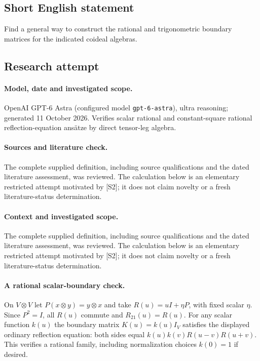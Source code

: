 \documentclass[11pt]{article}
\begin{document}
\subsection{Short English statement}
Find a general way to construct the rational and trigonometric boundary matrices for the indicated coideal algebras.
\subsection{Research attempt}
\paragraph{Model, date and investigated scope.}
OpenAI GPT-6 Astra (configured model \texttt{gpt-6-astra}), ultra reasoning; generated 11 October 2026. Verifies scalar rational and constant-square rational reflection-equation ansätze by direct tensor-leg algebra.

\paragraph{Sources and literature check.}
The complete supplied definition, including source qualifications and the dated literature assessment, was reviewed. The calculation below is an elementary restricted attempt motivated by [S2]; it does not claim novelty or a fresh literature-status determination.

\paragraph{Context and investigated scope.} The complete supplied definition, including source qualifications and the dated literature assessment, was reviewed. The calculation below is an elementary restricted attempt motivated by [S2]; it does not claim novelty or a fresh literature-status determination.

\paragraph{A rational scalar-boundary check.} On $V\otimes V$ let $P(x\otimes y)=y\otimes x$ and take $R(u)=uI+\eta P$, with fixed scalar $\eta$. Since $P^2=I$, all $R(u)$ commute and $R_{21}(u)=R(u)$. For any scalar function $k(u)$ the boundary matrix $K(u)=k(u)I_V$ satisfies the displayed ordinary reflection equation: both sides equal $k(u)k(v)R(u-v)R(u+v)$. This verifies a rational family, including normalization choices $k(0)=1$ if desired.
\end{document}
